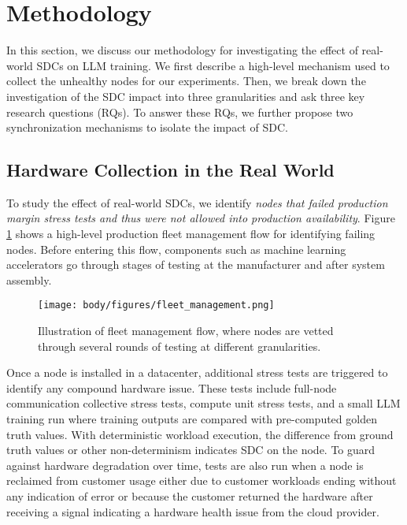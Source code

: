 
 
\section{Methodology} \label{sec:methodology}

In this section, we discuss our methodology for investigating the effect of real-world SDCs on LLM training. We first describe a high-level mechanism used to collect the unhealthy nodes for our experiments. Then, we break down the investigation of the SDC impact into three granularities and ask three key research questions (RQs). To answer these RQs, we further propose two synchronization mechanisms to isolate the impact of SDC.

\subsection{Hardware Collection in the Real World} 

To study the effect of real-world SDCs, we identify \emph{nodes that failed production margin stress tests and thus were not allowed into production availability}. Figure \ref{fig:fleet_management} shows a high-level production fleet management flow for identifying failing nodes. Before entering this flow, components such as machine learning accelerators go through stages of testing at the manufacturer and after system assembly.

\label{sec:sdc_fleet_management}
\begin{figure}[t]
    \centering
    \texttt{[image: body/figures/fleet\_management.png]}
    \vskip -0.05in
    \caption{Illustration of fleet management flow, where nodes are vetted through several rounds of testing at different granularities.}
    \vskip -0.2in
    \label{fig:fleet_management}
\end{figure}

Once a node is installed in a datacenter, additional stress tests are triggered to identify any compound hardware issue.
These tests include full-node communication collective stress tests, compute unit stress tests, and a small LLM training run where training outputs are compared with pre-computed golden truth values.
With deterministic workload execution, the difference from ground truth values or other non-determinism indicates SDC on the node.
To guard against hardware degradation over time, tests are also run when a node is reclaimed from customer usage either due to customer workloads ending without any indication of error or because the customer returned the hardware after receiving a signal indicating a hardware health issue from the cloud provider. 

